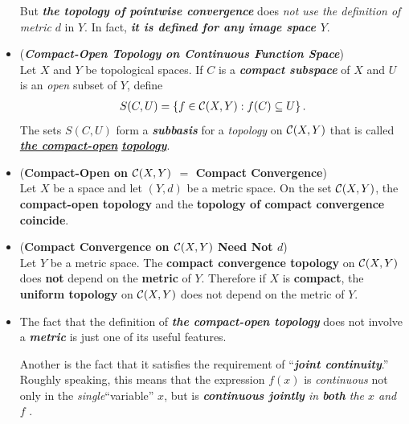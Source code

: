 \documentclass[11pt]{article}
\begin{document}
\begin{itemize}
\begin{remark}
But \emph{\textbf{the topology of  pointwise convergence}} does \emph{not use the definition of metric} $d$ in $Y$. In fact, \emph{\textbf{it is defined for any image space $Y$}}.
\end{remark}


\item \begin{definition} (\emph{\textbf{Compact-Open Topology on Continuous Function Space}})\\
Let $X$ and $Y$ be topological spaces. If $C$ is a \emph{\textbf{compact subspace}} of $X$ and $U$ is an \emph{open} subset of $Y$, define
\begin{align*}
S(C,U) = \left\{ f \in {\mathcal C}(X, Y): f(C) \subseteq U\right\}.
\end{align*}
The sets $S(C, U)$ form a \emph{\textbf{subbasis}} for a \emph{topology} on ${\mathcal C}(X, Y)$ that is called \underline{\emph{\textbf{the compact-open}}} \underline{\emph{\textbf{topology}}}.
\end{definition}

\item \begin{proposition} (\textbf{Compact-Open on ${\mathcal C}(X, Y)$ $=$ Compact Convergence}) \citep{munkres2000topology}\\
Let $X$ be a space and let $(Y, d)$ be a metric space. On the set ${\mathcal C}(X, Y)$, the \textbf{compact-open topology} and the \textbf{topology of compact convergence} \textbf{coincide}.
\end{proposition}

\item \begin{corollary}(\textbf{Compact Convergence on ${\mathcal C}(X, Y)$ Need Not $d$}) \citep{munkres2000topology}\\
Let $Y$ be a metric space. The \textbf{compact convergence topology} on ${\mathcal C}(X, Y)$ does  \textbf{not} depend on the \textbf{metric} of $Y$. Therefore if $X$ is \textbf{compact}, the \textbf{uniform topology} on ${\mathcal C}(X, Y)$ does not depend on the metric of $Y$.
\end{corollary}

\item \begin{remark} 
The fact that the definition of \emph{\textbf{the compact-open topology}} does not involve a \emph{\textbf{metric}} is just one of its useful features. 

Another is the fact that it satisfies the requirement of ``\emph{\textbf{joint continuity}}.” Roughly speaking, this means that the expression $f(x)$ is
\emph{continuous} not only in the \emph{single}``variable”  $x$, but is \emph{\textbf{continuous jointly} in \textbf{both} the $x$ and $f$} .
\end{remark}


\end{itemize}
\end{document}
